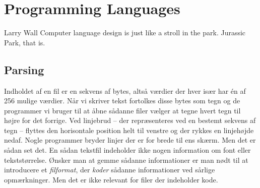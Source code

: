 \chapter{Programming Languages}
\label{sec:lang}

\begin{inspiration}{Larry Wall}
Computer language design is just like a stroll in the park. Jurassic Park, that is.
\end{inspiration}



\section{Parsing}

Indholdet af en fil er en sekvens af bytes, altså værdier der hver især har én af 256 mulige værdier. Når vi skriver tekst fortolkes disse bytes som tegn og de programmer vi bruger til at åbne sådanne filer vælger at tegne hvert tegn til højre for det forrige. Ved linjebrud -- der repræsenteres ved en bestemt sekvens af tegn -- flyttes den horisontale position helt til venstre og der rykkes en linjehøjde nedaf. Nogle programmer bryder linjer der er for brede til ens skærm. Men det er sådan set det. En sådan tekstfil indeholder ikke nogen information om font eller tekststørrelse. Ønsker man at gemme sådanne informationer er man nødt til at introducere et \textsl{filformat}, der \textsl{koder} sådanne informationer ved sårlige opmærkninger. Men det er ikke relevant for filer der indeholder kode.

